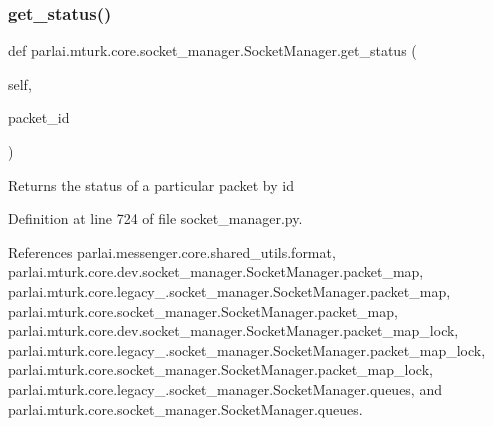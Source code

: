\mbox{\label{classparlai_1_1mturk_1_1core_1_1socket__manager_1_1SocketManager_ad14d75f5b3a3e41a9133de9cd1611b8b}} 
\subsubsection{\texorpdfstring{get\+\_\+status()}{get\_status()}}
{\footnotesize\ttfamily def parlai.\+mturk.\+core.\+socket\+\_\+manager.\+Socket\+Manager.\+get\+\_\+status (\begin{DoxyParamCaption}\item[{}]{self,  }\item[{}]{packet\+\_\+id }\end{DoxyParamCaption})}

\begin{DoxyVerb}Returns the status of a particular packet by id\end{DoxyVerb}
 

Definition at line 724 of file socket\+\_\+manager.\+py.



References parlai.\+messenger.\+core.\+shared\+\_\+utils.\+format, parlai.\+mturk.\+core.\+dev.\+socket\+\_\+manager.\+Socket\+Manager.\+packet\+\_\+map, parlai.\+mturk.\+core.\+legacy\+\_.\+socket\+\_\+manager.\+Socket\+Manager.\+packet\+\_\+map, parlai.\+mturk.\+core.\+socket\+\_\+manager.\+Socket\+Manager.\+packet\+\_\+map, parlai.\+mturk.\+core.\+dev.\+socket\+\_\+manager.\+Socket\+Manager.\+packet\+\_\+map\+\_\+lock, parlai.\+mturk.\+core.\+legacy\+\_.\+socket\+\_\+manager.\+Socket\+Manager.\+packet\+\_\+map\+\_\+lock, parlai.\+mturk.\+core.\+socket\+\_\+manager.\+Socket\+Manager.\+packet\+\_\+map\+\_\+lock, parlai.\+mturk.\+core.\+legacy\+\_.\+socket\+\_\+manager.\+Socket\+Manager.\+queues, and parlai.\+mturk.\+core.\+socket\+\_\+manager.\+Socket\+Manager.\+queues.

\mbox{\label{classparlai_1_1mturk_1_1core_1_1socket__manager_1_1SocketManager_aa970567ac565617328cd1a07548b1427}} 
